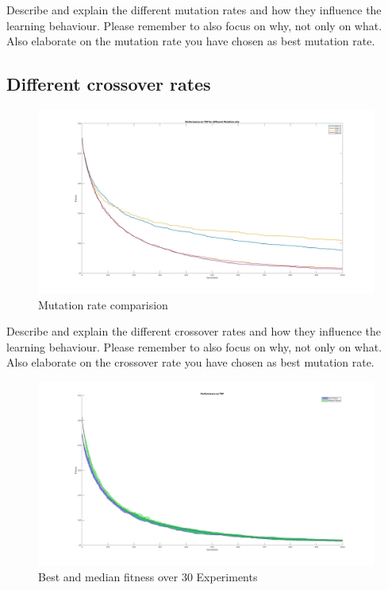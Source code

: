 \documentclass[a4paper, 12pt]{article}
\begin{document}
Describe and explain the different mutation rates and how they influence the learning behaviour. Please remember to also focus on why, not only on what.
Also elaborate on the mutation rate you have chosen as best mutation rate.

\newpage

\subsection{Different crossover rates}


\begin{figure}[ht!]
  \centering
  \includegraphics[width=1.0\textwidth]{images/mutation_exp_25.jpg}
    \caption{Mutation rate comparision\label{fig:mutfig}}
\end{figure}

Describe and explain the different crossover rates and how they influence the learning behaviour. Please remember to also focus on why, not only on what.
Also elaborate on the crossover rate you have chosen as best mutation rate.

\begin{figure}[ht!]
  \centering
  \includegraphics[width=1.0\textwidth]{images/1000X30_updated.jpg}
  \caption{Best and median fitness over 30 Experiments\label{fig:mutfig}}
\end{figure}
\end{document}
